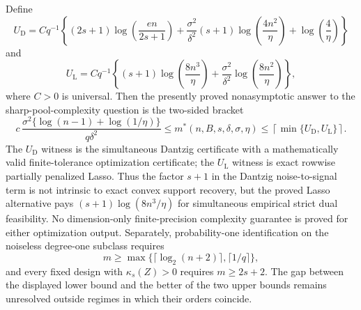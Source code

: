 Define
\[
 U_{\mathrm D}=Cq^{-1}\left\{(2s+1)\log\!\left(\frac{en}{2s+1}\right)
 +\frac{\sigma^2}{\delta^2}(s+1)\log\!\left(\frac{4n^2}{\eta}\right)
 +\log\!\left(\frac4\eta\right)\right\}
\]
and
\[
 U_{\mathrm L}=Cq^{-1}\left\{(s+1)\log\!\left(\frac{8n^3}{\eta}\right)
 +\frac{\sigma^2}{\delta^2}\log\!\left(\frac{8n^2}{\eta}\right)\right\},
\]
where \(C>0\) is universal.  Then the presently proved nonasymptotic answer to the sharp-pool-complexity question is the two-sided bracket
\[
 c\,\frac{\sigma^2\{\log(n-1)+\log(1/\eta)\}}{q\delta^2}
 \le m^*(n,B,s,\delta,\sigma,\eta)
 \le \left\lceil\min\{U_{\mathrm D},U_{\mathrm L}\}\right\rceil.
\]
The \(U_{\mathrm D}\) witness is the simultaneous Dantzig certificate with a mathematically valid finite-tolerance optimization certificate; the \(U_{\mathrm L}\) witness is exact rowwise partially penalized Lasso.  Thus the factor \(s+1\) in the Dantzig noise-to-signal term is not intrinsic to exact convex support recovery, but the proved Lasso alternative pays \((s+1)\log(8n^3/\eta)\) for simultaneous empirical strict dual feasibility.  No dimension-only finite-precision complexity guarantee is proved for either optimization output.  Separately, probability-one identification on the noiseless degree-one subclass requires
\[
 m\ge\max\{\lceil\log_2(n+2)\rceil,\lceil1/q\rceil\},
\]
and every fixed design with \(\kappa_s(Z)>0\) requires \(m\ge2s+2\).  The gap between the displayed lower bound and the better of the two upper bounds remains unresolved outside regimes in which their orders coincide.
